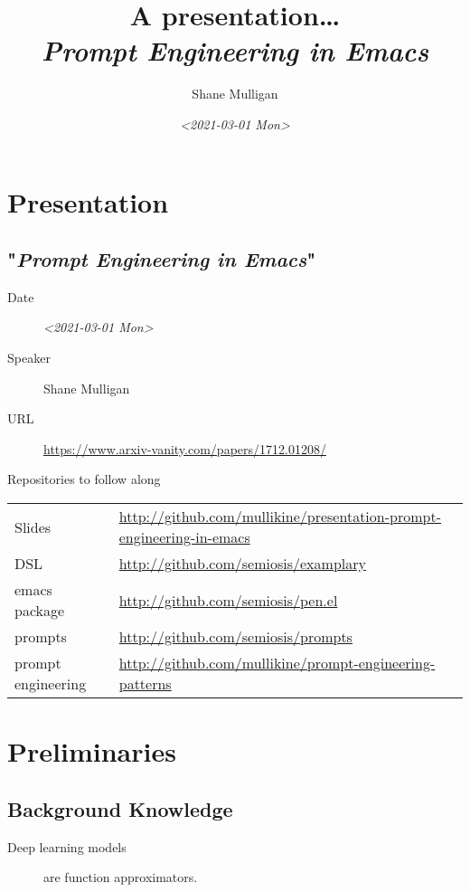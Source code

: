 \documentclass[presentation]{beamer}
\author{Shane Mulligan \\  }
\date{\textit{<2021-03-01 Mon>}}
\title{A presentation\ldots{} \\   \emph{\alert{Prompt Engineering in Emacs}} \\  }
\begin{document}
\maketitle

\section{Presentation}
\label{sec:org05daa9f}
\subsection{"\emph{Prompt Engineering in Emacs}"}
\label{sec:orgf1912c5}
\begin{description}
\item[{Date}] \textit{<2021-03-01 Mon>}
\item[{Speaker}] Shane Mulligan
\item[{URL}] \url{https://www.arxiv-vanity.com/papers/1712.01208/}
\end{description}

\begin{frame}[label={sec:org7c1eb9c}]{Repositories to follow along}
\begin{center}
\begin{tabular}{ll}
Slides & \url{http://github.com/mullikine/presentation-prompt-engineering-in-emacs}\\
DSL & \url{http://github.com/semiosis/examplary}\\
emacs package & \url{http://github.com/semiosis/pen.el}\\
prompts & \url{http://github.com/semiosis/prompts}\\
prompt engineering & \url{http://github.com/mullikine/prompt-engineering-patterns}\\
\end{tabular}
\end{center}
\end{frame}

\section{Preliminaries}
\label{sec:org8f6f8b7}
\subsection{Background Knowledge}
\label{sec:orgd7476e7}
\begin{description}
\item[{Deep learning models}] are function approximators.
\end{description}
\end{document}
